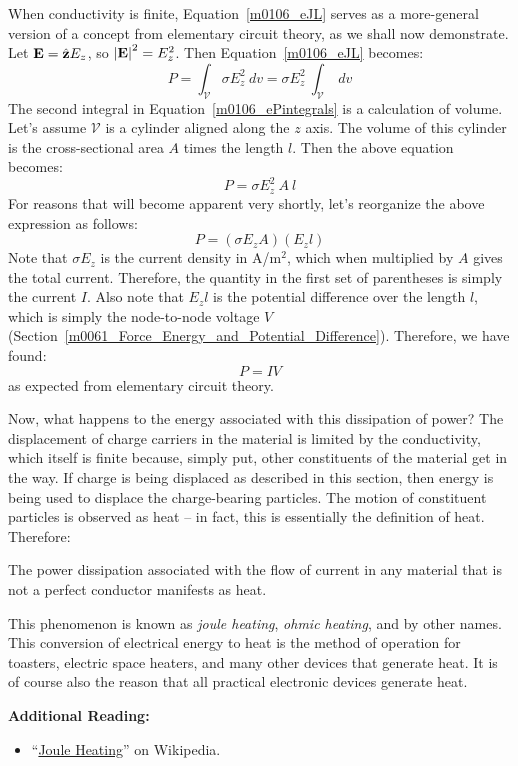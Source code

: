 When conductivity is finite, Equation~\ref{m0106_eJL} serves as a more-general version of a concept from elementary circuit theory, as we shall now demonstrate.
Let ${\bf E}=\hat{\bf z}E_z$, so $\left|{\bf E}\right|^2=E_z^2$.
Then Equation~\ref{m0106_eJL} becomes:
%
\begin{equation}
P = \int_{\mathcal V} \sigma E_z^2~dv = \sigma E_z^2~\int_{\mathcal V}~dv
\label{m0106_ePintegrals}
\end{equation}
%
The second integral in Equation~\ref{m0106_ePintegrals} is a calculation of volume.  
Let's assume ${\mathcal V}$ is a cylinder aligned along the $z$ axis.
The volume of this cylinder is the cross-sectional area $A$ times the length $l$.
Then the above equation becomes:
%
\begin{equation}
P = \sigma E_z^2~A~l 
\end{equation}
%
For reasons that will become apparent very shortly, let's reorganize the above expression as follows:
%
\begin{equation}
P = \left(\sigma E_z A\right) \left(E_z l\right)
\end{equation}
%
Note that $\sigma E_z$ is the current density in A/m$^2$, which when multiplied by $A$ gives the total current.  
Therefore, the quantity in the first set of parentheses is simply the current $I$.
Also note that $E_z l$ is the potential difference over the length $l$, which is simply the node-to-node voltage $V$ (Section~\ref{m0061_Force_Energy_and_Potential_Difference}).
Therefore, we have found:
%
\begin{equation}
P =  IV 
\end{equation}
%
as expected from elementary circuit theory.

Now, what happens to the energy associated with this dissipation of power?
The displacement of charge carriers in the material is limited by the conductivity, which itself is finite because, simply put, other constituents of the material get in the way.  If charge is being displaced as described in this section, then energy is being used to displace the charge-bearing particles.  The motion of constituent particles is observed as heat -- in fact, this is essentially the definition of heat.
Therefore:
%
\begin{mdframed}[backgroundcolor=yellow!20,nobreak=true] 
The power dissipation associated with the flow of current in any material that is not a perfect conductor manifests as heat.
\end{mdframed}
%
This phenomenon is known as \emph{joule heating}, 
\emph{ohmic heating}, 
and by other names. 
This conversion of electrical energy to heat is the method of operation for toasters, electric space heaters, and many other devices that generate heat.
It is of course also the reason that all practical electronic devices generate heat.


{\bf Additional Reading:}
\begin{itemize}
\item ``\href{https://en.wikipedia.org/wiki/Joule_heating}{Joule Heating}'' on Wikipedia.
\end{itemize}




